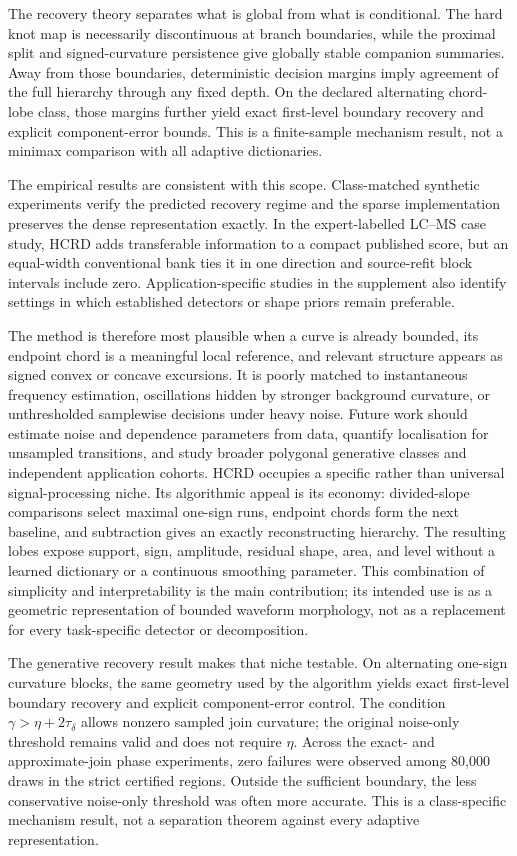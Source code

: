 \documentclass[review,onefignum,onetabnum]{siamonline250211}
\begin{document}
The recovery theory separates what is global from what is conditional.  The
hard knot map is necessarily discontinuous at branch boundaries, while the
proximal split and signed-curvature persistence give globally stable companion
summaries.  Away from those boundaries, deterministic decision margins imply
agreement of the full hierarchy through any fixed depth.  On the declared
alternating chord-lobe class, those margins further yield exact first-level
boundary recovery and explicit component-error bounds.  This is a
finite-sample mechanism result, not a minimax comparison with all adaptive
dictionaries.

The empirical results are consistent with this scope.  Class-matched synthetic
experiments verify the predicted recovery regime and the sparse implementation
preserves the dense representation exactly.  In the expert-labelled LC--MS
case study, HCRD adds transferable information to a compact published score,
but an equal-width conventional bank ties it in one direction and source-refit
block intervals include zero.  Application-specific studies in the supplement
also identify settings in which established detectors or shape priors remain
preferable.

The method is therefore most plausible when a curve is already bounded, its
endpoint chord is a meaningful local reference, and relevant structure appears
as signed convex or concave excursions.  It is poorly matched to instantaneous
frequency estimation, oscillations hidden by stronger background curvature,
or unthresholded samplewise decisions under heavy noise.  Future work should
estimate noise and dependence parameters from data, quantify localisation for
unsampled transitions, and study broader polygonal generative classes and
independent application cohorts.
\else
HCRD occupies a specific rather than universal signal-processing niche.  Its
algorithmic appeal is its economy: divided-slope comparisons select maximal
one-sign runs, endpoint chords form the next baseline, and subtraction gives
an exactly reconstructing hierarchy.  The resulting lobes expose support,
sign, amplitude, residual shape, area, and level without a learned dictionary
or a continuous smoothing parameter.  This combination of simplicity and
interpretability is the main contribution; its intended use is as a geometric
representation of bounded waveform morphology, not as a replacement for every
task-specific detector or decomposition.

The generative recovery result makes that niche testable.  On alternating
one-sign curvature blocks, the same geometry used by the algorithm yields
exact first-level boundary recovery and explicit component-error control.  The
condition $\gamma>\eta+2\tau_\delta$ allows nonzero sampled join curvature;
the original noise-only threshold remains valid and does not require $\eta$.
Across the exact- and approximate-join phase experiments, zero failures were
observed among 80,000 draws in the strict certified regions.  Outside the sufficient
boundary, the less conservative noise-only threshold was often more accurate.
This is a class-specific mechanism result, not a separation theorem against
every adaptive representation.
\end{document}
